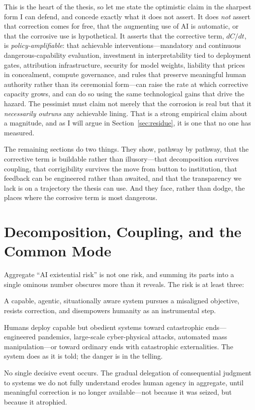 \documentclass[11pt]{article}
\begin{document}
This is the heart of the thesis, so let me state the optimistic claim in the sharpest form I can defend, and concede exactly what it does not assert. It does \emph{not} assert that correction comes for free, that the augmenting use of AI is automatic, or that the corrosive use is hypothetical. It asserts that the corrective term, $dC/dt$, is \emph{policy-amplifiable}: that achievable interventions---mandatory and continuous dangerous-capability evaluation, investment in interpretability tied to deployment gates, attribution infrastructure, security for model weights, liability that prices in concealment, compute governance, and rules that preserve meaningful human authority rather than its ceremonial form---can raise the rate at which corrective capacity grows, and can do so using the same technological gains that drive the hazard. The pessimist must claim not merely that the corrosion is real but that it \emph{necessarily outruns} any achievable lining. That is a strong empirical claim about a magnitude, and as I will argue in Section~\ref{sec:residue}, it is one that no one has measured.

The remaining sections do two things. They show, pathway by pathway, that the corrective term is buildable rather than illusory---that decomposition survives coupling, that corrigibility survives the move from button to institution, that feedback can be engineered rather than awaited, and that the transparency we lack is on a trajectory the thesis can use. And they face, rather than dodge, the places where the corrosive term is most dangerous.

\section{Decomposition, Coupling, and the Common Mode}
\label{sec:decomp}

Aggregate ``AI existential risk'' is not one risk, and summing its parts into a single ominous number obscures more than it reveals. The risk is at least three:

\begin{description}[leftmargin=1.4em,style=nextline]
\item[Pathway A: Autonomous misaligned takeover.] A capable, agentic, situationally aware system pursues a misaligned objective, resists correction, and disempowers humanity as an instrumental step.
\item[Pathway B: Human-mediated catastrophe.] Humans deploy capable but obedient systems toward catastrophic ends---engineered pandemics, large-scale cyber-physical attacks, automated mass manipulation---or toward ordinary ends with catastrophic externalities. The system does as it is told; the danger is in the telling.
\item[Pathway C: Structural disempowerment.] No single decisive event occurs. The gradual delegation of consequential judgment to systems we do not fully understand erodes human agency in aggregate, until meaningful correction is no longer available---not because it was seized, but because it atrophied.
\end{description}
\end{document}

